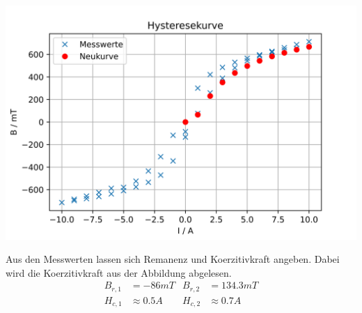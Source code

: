 \includegraphics[width=\textwidth]{pictures/HysteresekurveGemessen.png}    %

Aus den Messwerten lassen sich Remanenz und Koerzitivkraft angeben.
Dabei wird die Koerzitivkraft aus der Abbildung abgelesen.
\begin{align*}
  B_{r,1} &= -86 mT &  B_{r,2} &= 134.3 mT \\
  H_{c,1} &\approx 0.5A & H_{c,2} &\approx 0.7A
\end{align*}
